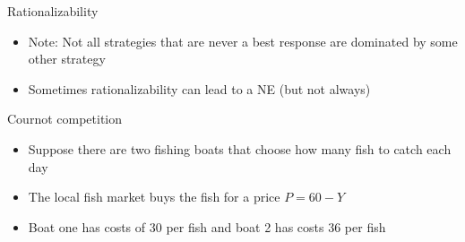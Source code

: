 \documentclass[10pt]{beamer}
\begin{document}
\begin{frame}[label={sec:org6763a6d}]{}
\alert{Rationalizability}
\begin{itemize}
\item Note: Not all strategies that are never a best response are dominated by some other strategy
\item Sometimes rationalizability can lead to a NE (but not always)
\end{itemize}
\end{frame}
\begin{frame}[label={sec:org5bfcd1d}]{}
\alert{Cournot competition}
\begin{itemize}
\item Suppose there are two fishing boats that choose how many fish to catch each day
\item The local fish market buys the fish for a price \(P=60-Y\)
\item Boat one has costs of 30 per fish and boat 2 has costs 36 per fish
\end{itemize}
\end{frame}
\end{document}
